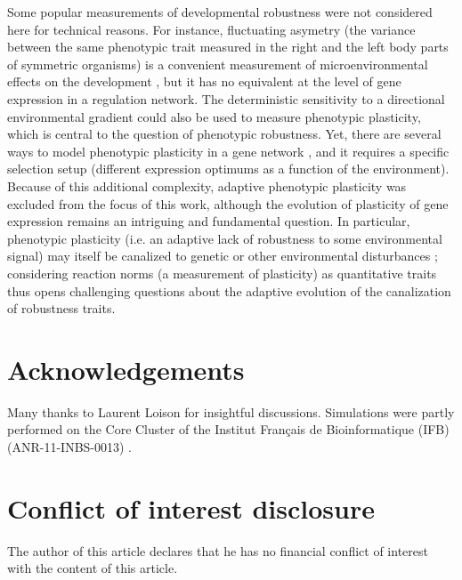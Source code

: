 \documentclass[10pt,a4paper]{article}
\begin{document}
Some popular measurements of developmental robustness were not considered here for technical reasons. For instance, fluctuating asymetry (the variance between the same phenotypic trait measured in the right and the left body parts of symmetric organisms) is a convenient measurement of microenvironmental effects on the development \citep{DD01,LK05}, but it has no equivalent at the level of gene expression in a regulation network. The deterministic sensitivity to a directional environmental gradient could also be used to measure phenotypic plasticity, which is central to the question of phenotypic robustness. Yet, there are several ways to model phenotypic plasticity in a gene network \citep{Mas04,BTL21}, and it requires a specific selection setup (different expression optimums as a function of the environment). Because of this additional complexity, adaptive phenotypic plasticity was excluded from the focus of this work, although the evolution of plasticity of gene expression remains an intriguing and fundamental question. In particular, phenotypic plasticity (i.e. an adaptive lack of robustness to some environmental signal) may itself be canalized to genetic or other environmental disturbances \citep{SK94}; considering reaction norms (a measurement of plasticity) as quantitative traits thus opens challenging questions about the adaptive evolution of the canalization of robustness traits.

\section*{Acknowledgements}

Many thanks to Laurent Loison for insightful discussions. Simulations were partly performed on the Core Cluster of the Institut Français de Bioinformatique (IFB) (ANR-11-INBS-0013) .

\section*{Conflict of interest disclosure}

The author of this article declares that he has no financial conflict of interest with the content of this article.

\printbibliography

\clearpage
\end{document}
